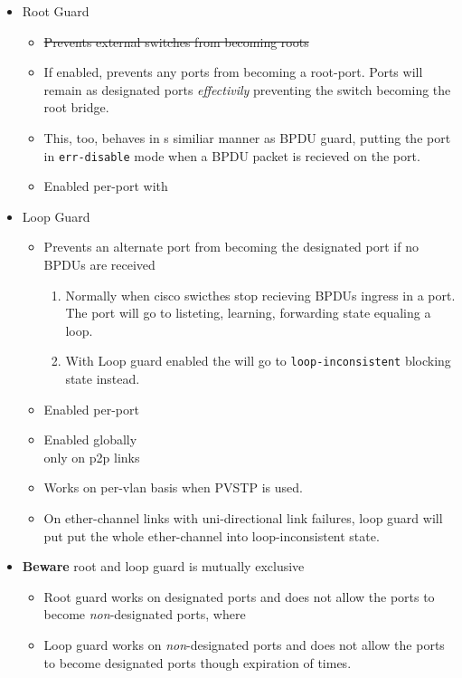 \begin{itemize}
\begin{itemize}
    \end{itemize}
    \item Root Guard
    \begin{itemize}
        \item \st{Prevents external switches from becoming roots}
        \item If enabled, prevents any ports from becoming a root-port. Ports will remain as designated ports \textit{effectivily} preventing the switch becoming the root bridge.
        \item This, too, behaves in s similiar manner as BPDU guard, putting the port in \texttt{err-disable} mode when a BPDU packet is recieved on the port.
        \item Enabled per-port with\\
    \end{itemize}
    \item Loop Guard
    \begin{itemize}
        \item Prevents an alternate port from becoming the designated port if no BPDUs are received
        \begin{enumerate}
            \item Normally when cisco swicthes stop recieving BPDUs ingress in a port. The port will go to listeting, learning, forwarding state equaling a loop.
            \item With Loop guard enabled the will go to \texttt{loop-inconsistent} blocking state instead.
        \end{enumerate}
        \item Enabled per-port\\
        \item Enabled globally\\ {\small only on p2p links}
        \item Works on per-vlan basis when PVSTP is used.
        \item On ether-channel links with uni-directional link failures, loop guard will put put the whole ether-channel into loop-inconsistent state.
    \end{itemize}
    \item \textbf{Beware} root and loop guard is mutually exclusive
    \begin{itemize}
        \item Root guard works on designated ports and does not allow the ports to become \textit{non}-designated ports, where
        \item Loop guard works on \textit{non}-designated ports and does not allow the ports to become designated ports {\footnotesize though expiration of times}.
\end{itemize}


\end{itemize}
